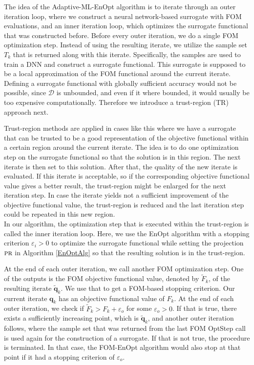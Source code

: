 The idea of the Adaptive-ML-EnOpt algorithm is to iterate through an outer iteration loop, where we construct a neural network-based surrogate with FOM evaluations, and an inner iteration loop, which optimizes the surrogate functional that was constructed before. Before every outer iteration, we do a single FOM optimization step. Instead of using the resulting iterate, we utilize the sample set $T_k$ that is returned along with this iterate. Specifically, the samples are used to train a DNN and construct a surrogate functional. This surrogate is supposed to be a local approximation of the FOM functional around the current iterate. Defining a surrogate functional with globally sufficient accuracy would not be possible, since $\mathcal{D}$ is unbounded, and even if it where bounded, it would usually be too expensive computationally. Therefore we introduce a trust-region (TR) approach \cite{Nocedal2006-hg} next.

Trust-region methods are applied in cases like this where we have a surrogate that can be trusted to be a good representation of the objective functional within a certain region around the current iterate. The idea is to do one optimization step on the surrogate functional so that the solution is in this region. The next iterate is then set to this solution. After that, the quality of the new iterate is evaluated. If this iterate is acceptable, so if the corresponding objective functional value gives a better result, the trust-region might be enlarged for the next iteration step. In case the iterate yields not a sufficient improvement of the objective functional value, the trust-region is reduced and the last iteration step could be repeated in this new region.\\

In our algorithm, the optimization step that is executed within the trust-region is called the inner iteration loop. Here, we use the EnOpt algorithm with a stopping criterion $\varepsilon_i>0$ to optimize the surrogate functional while setting the projection $\textproc{pr}$ in Algorithm \ref{EnOptAlg} so that the resulting solution is in the trust-region.

At the end of each outer iteration, we call another FOM optimization step. One of the outputs is the FOM objective functional value, denoted by $\tilde{F}_k$, of the resulting iterate $\tilde{\mathbf{q}}_k$. We use that to get a FOM-based stopping criterion. Our current iterate $\mathbf{q}_k$ has an objective functional value of $F_k$. At the end of each outer iteration, we check if $\tilde{F}_k>F_k+\varepsilon_o$ for some $\varepsilon_o>0$. If that is true, there exists a sufficiently increasing point, which is $\tilde{\mathbf{q}}_k$, and another outer iteration follows, where the sample set that was returned from the last FOM OptStep call is used again for the construction of a surrogate. If that is not true, the procedure is terminated. In that case, the FOM-EnOpt algorithm would also stop at that point if it had a stopping criterion of $\varepsilon_o$.\\

